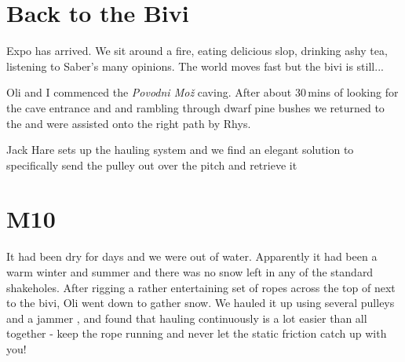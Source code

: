 \section{Back to the Bivi}


Expo has arrived. We sit around a fire, eating delicious slop, drinking ashy tea, listening to Saber's many opinions. The world moves fast but the bivi is still...

Oli and I commenced the \emph{Povodni Mo\v{z}} caving. After about 30\,mins of looking for the cave entrance and and rambling through dwarf pine bushes we returned to the  and were assisted onto the right path by Rhys.

\begin{marginfigure}
\checkoddpage \ifoddpage \forcerectofloat \else \forceversofloat \fi
\centering
 \caption{Jack Hare sets up the hauling system and we find an elegant solution to specifically send the pulley out over the pitch and retrieve it }
 \label{M10haul}
\end{marginfigure}

\section{M10}
It had been dry for days and we were out of water. Apparently it had been a warm winter and summer and there was no snow left in any of the standard shakeholes. After rigging a rather entertaining set of ropes across the top of  next to the bivi, Oli went down to gather snow. We hauled it up using several pulleys and a jammer , and found that hauling continuously is a lot easier than all together - keep the rope running and never let the static friction catch up with you!


